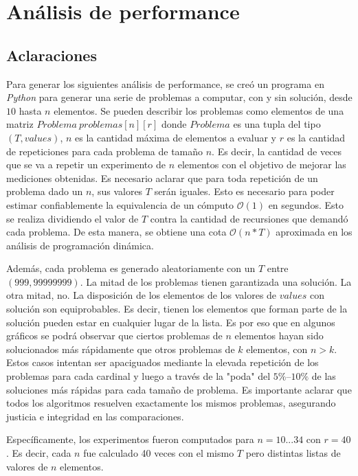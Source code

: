 \section{Análisis de performance}
\subsection{Aclaraciones}
Para generar los siguientes análisis de performance, se creó un programa en \textit{Python} para generar una serie de problemas a computar, con y sin solución, desde $10$ hasta $n$ elementos. Se pueden describir los problemas como elementos de una matriz $Problema \ problemas[n][r]$ donde $Problema$ es una tupla del tipo $(T, values)$, $n$ es la cantidad máxima de elementos a evaluar y $r$ es la cantidad de repeticiones para cada problema de tamaño $n$. Es decir, la cantidad de veces que se va a repetir un experimento de $n$ elementos con el objetivo de mejorar las mediciones obtenidas. Es necesario aclarar que para toda repetición de un problema dado un $n$, sus valores $T$ serán iguales. Esto es necesario para poder estimar confiablemente la equivalencia de un cómputo $\mathcal{O}(1)$ en segundos. Esto se realiza dividiendo el valor de $T$ contra la cantidad de recursiones que demandó cada problema. De esta manera, se obtiene una cota $\mathcal{O}(n*T)$ aproximada en los análisis de programación dinámica.

\vskip 8pt

Además, cada problema es generado aleatoriamente con un $T$ entre $(999, 99999999)$. La mitad de los problemas tienen garantizada una solución. La otra mitad, no. La disposición de los elementos de los valores de $values$ con solución son equiprobables. Es decir, tienen los elementos que forman parte de la solución pueden estar en cualquier lugar de la lista. Es por eso que en algunos gráficos se podrá observar que ciertos problemas de $n$ elementos hayan sido solucionados más rápidamente que otros problemas de $k$ elementos, con $n > k$. Estos casos intentan ser apaciguados mediante la elevada repetición de los problemas para cada cardinal y luego a través de la "poda" del $5\%–10\%$ de las soluciones más rápidas para cada tamaño de problema. Es importante aclarar que todos los algoritmos resuelven exactamente los mismos problemas, asegurando justicia e integridad en las comparaciones.

\vskip 8pt

Específicamente, los experimentos fueron computados para $n = 10 ... 34$ con $r = 40$. Es decir, cada $n$ fue calculado 40 veces con el mismo $T$ pero distintas listas de valores de $n$ elementos.

